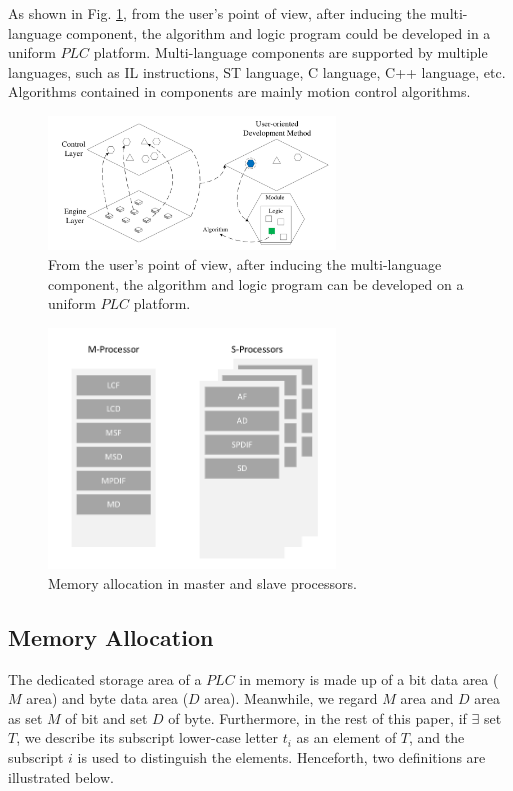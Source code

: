 \documentclass[journal,UTF8]{IEEEtran}
\begin{document}
As shown in Fig. \ref{fig:SoftwareStructure}, from the user's point of view, after inducing the multi-language component, the algorithm and logic program could be developed in a uniform $PLC$ platform. Multi-language components are supported by multiple languages, such as IL instructions, ST language, C language, C++ language, etc. Algorithms contained in components are mainly motion control algorithms.
\begin{figure}
	\centering
	\includegraphics[width=3in]{fig/FIG3.pdf}
	\caption{ From the user's point of view, after inducing the multi-language component, the algorithm and logic program can be developed on a uniform $PLC$ platform.}
	\label{fig:SoftwareStructure}
\end{figure}


\begin{figure}
	\centering
	\includegraphics[width=3in]{fig/FIG4.pdf}
	\caption{ Memory allocation in master and slave processors.}
	\label{fig:Memory}
\end{figure}

\subsection{Memory Allocation}  

The dedicated storage area of a $PLC$ in memory is made up of a bit data area ($M$ area) and byte data area ($D$ area). Meanwhile, we regard $M$ area and $D$ area as set $M$ of bit and set $D$ of byte. Furthermore, in the rest of this paper, if $\exists$ set $T$, we describe its subscript lower-case letter $t_i$ as an element of $T$, and the subscript $i$ is used to distinguish the elements. Henceforth, two definitions are illustrated below.
\end{document}
